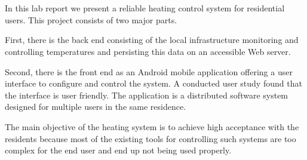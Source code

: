 
\chapter*{\abstractname}
\label{chap:abstract}

In this lab report we present a reliable heating control system for residential users.
This project consists of two major parts.

First, there is the back end consisting of the local infrastructure monitoring and controlling temperatures and persisting this data on an accessible Web server.

Second, there is the front end as an Android mobile application offering a user interface to configure and control the system.
A conducted user study found that the interface is user friendly.
The application is a distributed software system designed for multiple users in the same residence.

The main objective of the heating system is to achieve high acceptance with the residents because most of the existing tools for controlling such systems are too complex for the end user and end up not being used properly.